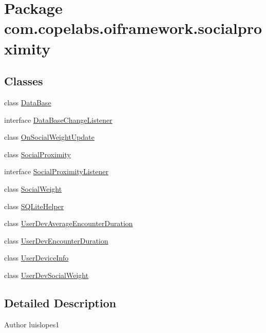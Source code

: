 \hypertarget{namespacecom_1_1copelabs_1_1oiframework_1_1socialproximity}{}\section{Package com.\+copelabs.\+oiframework.\+socialproximity}
\label{namespacecom_1_1copelabs_1_1oiframework_1_1socialproximity}
\subsection*{Classes}
\begin{DoxyCompactItemize}
\item 
class \hyperlink{classcom_1_1copelabs_1_1oiframework_1_1socialproximity_1_1_data_base}{Data\+Base}
\item 
interface \hyperlink{interfacecom_1_1copelabs_1_1oiframework_1_1socialproximity_1_1_data_base_change_listener}{Data\+Base\+Change\+Listener}
\item 
class \hyperlink{classcom_1_1copelabs_1_1oiframework_1_1socialproximity_1_1_on_social_weight_update}{On\+Social\+Weight\+Update}
\item 
class \hyperlink{classcom_1_1copelabs_1_1oiframework_1_1socialproximity_1_1_social_proximity}{Social\+Proximity}
\item 
interface \hyperlink{interfacecom_1_1copelabs_1_1oiframework_1_1socialproximity_1_1_social_proximity_listener}{Social\+Proximity\+Listener}
\item 
class \hyperlink{classcom_1_1copelabs_1_1oiframework_1_1socialproximity_1_1_social_weight}{Social\+Weight}
\item 
class \hyperlink{classcom_1_1copelabs_1_1oiframework_1_1socialproximity_1_1_s_q_lite_helper}{S\+Q\+Lite\+Helper}
\item 
class \hyperlink{classcom_1_1copelabs_1_1oiframework_1_1socialproximity_1_1_user_dev_average_encounter_duration}{User\+Dev\+Average\+Encounter\+Duration}
\item 
class \hyperlink{classcom_1_1copelabs_1_1oiframework_1_1socialproximity_1_1_user_dev_encounter_duration}{User\+Dev\+Encounter\+Duration}
\item 
class \hyperlink{classcom_1_1copelabs_1_1oiframework_1_1socialproximity_1_1_user_device_info}{User\+Device\+Info}
\item 
class \hyperlink{classcom_1_1copelabs_1_1oiframework_1_1socialproximity_1_1_user_dev_social_weight}{User\+Dev\+Social\+Weight}
\end{DoxyCompactItemize}


\subsection{Detailed Description}
\begin{DoxyAuthor}{Author}
luislopes1 
\end{DoxyAuthor}
